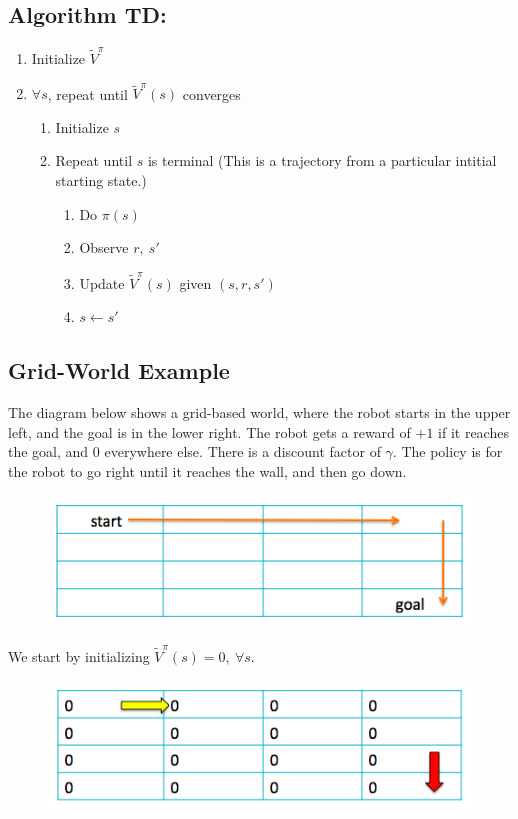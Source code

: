 \documentclass[11pt]{article}
\numberwithin{equation}{section}
\numberwithin{figure}{section}
\begin{document}
\subsection*{Algorithm TD:}
\begin{enumerate}
	\item Initialize $\tilde{V}^\pi$
	\item $\forall s$, repeat until $\tilde{V}^\pi(s)$ converges
	\begin{enumerate}
		\item Initialize $s$
		\item Repeat until $s$ is terminal (This is a trajectory from a particular intitial starting state.)
		\begin{enumerate}
			\item Do $\pi(s)$
			\item Observe $r, \ s'$
			\item Update $\tilde{V}^\pi(s)$ given  $(s, r, s')$
			\label{step.updateTD}
			\item $s \leftarrow s'$
		\end{enumerate}		
	\end{enumerate}		
\end{enumerate}		

\subsection*{Grid-World Example}
The diagram below shows a grid-based world, where the robot starts in the upper left, and the goal is in the lower right.  The robot gets a reward of $+1$ if it reaches the goal, and $0$ everywhere else.  There is a discount factor of $\gamma$.  The policy is for the robot to go right until it reaches the wall, and then go down.
\begin{figure}[h!]
	\centering
	\includegraphics[width=.4\columnwidth]{./images/fig1}
	\label{fig.fig1}
\end{figure}

We start by initializing $\tilde{V}^\pi(s) = 0,\ \forall s$.

\begin{figure}[h!]
	\centering
	\includegraphics[width=.4\columnwidth]{./images/fig2}
	\label{fig.fig2}
\end{figure}
\end{document}
